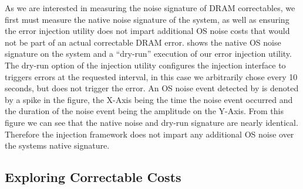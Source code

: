 As we are interested in measuring the noise signature of DRAM correctables, we
first must measure the native noise signature of the system, as well as ensuring
the error injection utility does not impart additional OS noise costs that would
not be part of an actual correctable DRAM error.   shows the
native OS noise signature on the \blake system and a ``dry-run'' execution of
our error injection utility.  The dry-run option of the injection utility
configures the injection interface to triggers errors at the requested interval,
in this case we arbitrarily chose every 10 seconds, but does not trigger the
error.  An OS noise event detected by \selfish is denoted by a spike in the
figure, the X-Axis being the time the noise event occurred and the duration of
the noise event being the amplitude on the Y-Axis.  From this figure we can see
that the native noise and dry-run signature are nearly identical.  Therefore the
injection framework does not impart any additional OS noise over the systems
native signature.  

\begin{figure*}
\caption{
}
\label{fig:DRAM_cost}
\end{figure*}


\subsection{Exploring Correctable Costs}  


